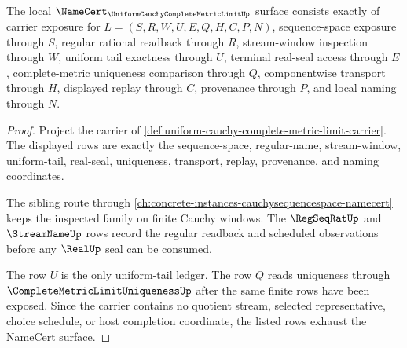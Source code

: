 \begin{theorem}
\label{thm:uniform-cauchy-complete-metric-limit-obligations}
The local $\NameCert_{\UniformCauchyCompleteMetricLimitUp}$ surface consists exactly of carrier exposure for $L=(S,R,W,U,E,Q,H,C,P,N)$, sequence-space exposure through $S$, regular rational readback through $R$, stream-window inspection through $W$, uniform tail exactness through $U$, terminal real-seal access through $E$, complete-metric uniqueness comparison through $Q$, componentwise transport through $H$, displayed replay through $C$, provenance through $P$, and local naming through $N$.
\end{theorem}
\begin{proof}
Project the carrier of \autoref{def:uniform-cauchy-complete-metric-limit-carrier}. The displayed rows are exactly the sequence-space, regular-name, stream-window, uniform-tail, real-seal, uniqueness, transport, replay, provenance, and naming coordinates.

The sibling route through \autoref{ch:concrete-instances-cauchysequencespace-namecert} keeps the inspected family on finite Cauchy windows. The $\RegSeqRatUp$ and $\StreamNameUp$ rows record the regular readback and scheduled observations before any $\RealUp$ seal can be consumed.

The row $U$ is the only uniform-tail ledger. The row $Q$ reads uniqueness through $\CompleteMetricLimitUniquenessUp$ after the same finite rows have been exposed. Since the carrier contains no quotient stream, selected representative, choice schedule, or host completion coordinate, the listed rows exhaust the NameCert surface.
\end{proof}

